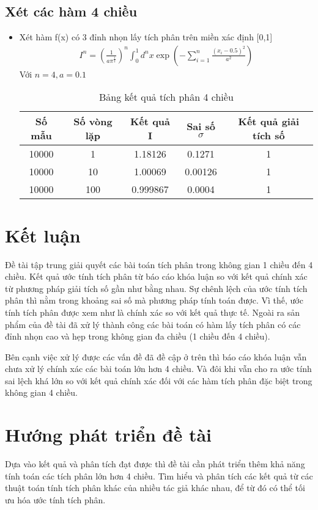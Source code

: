 \subsection{Xét các hàm 4 chiều}\label{subsec:3.2.4}
\begin{itemize}
    \item Xét hàm f(x) có 3 đỉnh nhọn lấy tích phân trên miền xác định [0,1]
    \begin{align}
        I^n=\left(\frac{1}{a{\pi}^{\frac{1}{2}}}\right)^n\int_{0}^{1} 
        {d^nx\exp\left({-\sum_{i=1}^n{\frac{(x_i-0.5)^2}{a^2}}}\right)}
    \end{align}
    Với $n=4, a=0.1$
    \begin{table}[H]
        \centering
        \begin{tabular}{ |c|c|c|c|c| }
         \hline
         \multicolumn{1}{|c}{Số mẫu} & \multicolumn{1}{|c|}{Số vòng lặp} & \multicolumn{1}{|c|}{Kết quả I} & \multicolumn{1}{|c|}{Sai số $\sigma$} & \multicolumn{1}{|c|}{Kết quả giải tích số} \\
         \hline
         10000 & 1  &  1.18126 & 0.1271 & 1 \\
         \hline
         10000 & 10  & 1.00069 & 0.00126 & 1 \\
         \hline
         10000 & 100  & 0.999867 & 0.0004 & 1 \\
         \hline
        \end{tabular}
        \caption{Bảng kết quả tích phân 4 chiều}
        \label{4d_xyzt}
       \end{table}
\end{itemize}

\section{Kết luận}\label{sec:4.2}
Đề tài tập trung giải quyết các bài toán tích phân trong không gian 1 chiều đến 4 chiều.
Kết quả ước tính tích phân từ báo cáo khóa luận so với kết quả chính xác từ phương pháp giải tích số gần như bằng nhau.
Sự chênh lệch của ước tính tích phân thì nằm trong khoảng sai số mà phương pháp tính toán được. 
Vì thế, ước tính tích phân được xem như là chính xác so với kết quả thực tế. 
Ngoài ra sản phẩm của đề tài đã xử lý thành công các bài toán có hàm lấy tích phân có các đỉnh nhọn cao và hẹp trong không gian đa chiều (1 chiều đến 4 chiều).\par
Bên cạnh việc xử lý được các vấn đề đã đề cập ở trên thì báo cáo khóa luận vẫn chưa xử lý chính xác các bài toán lớn hơn 4 chiều. 
Và đôi khi vẫn cho ra ước tính sai lệch khá lớn so với kết quả chính xác đối với các hàm tích phân đặc biệt trong không gian 4 chiều.  
\section{Hướng phát triển đề tài}\label{sec:4.1}
Dựa vào kết quả và phân tích đạt được thì đề tài cần phát triển thêm khả năng tính toán các tích phân lớn hơn 4 chiều. 
Tìm hiểu và phân tích các kết quả từ các thuật toán tính tích phân khác của nhiều tác giả khác nhau, để từ đó có thể tối ưu hóa ước tính tích phân.